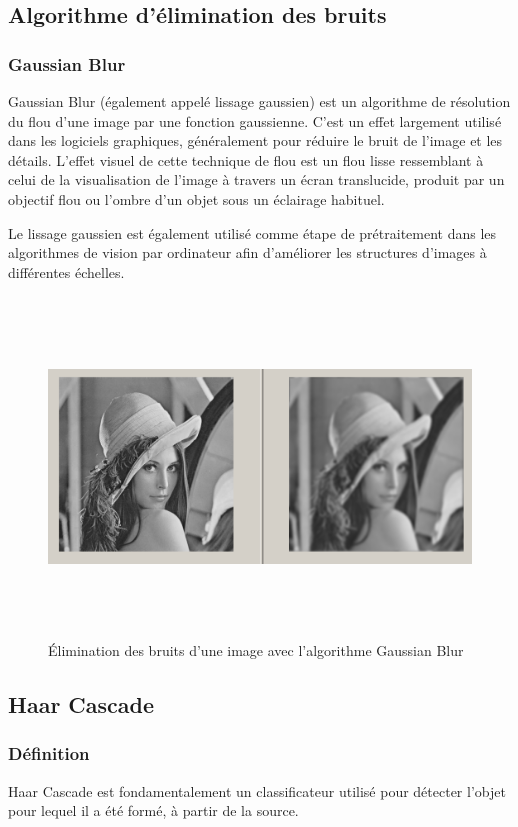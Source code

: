 \documentclass[12pt]{article}
\begin{document}
\subsection{Algorithme d'élimination des bruits}
\subsubsection*{Gaussian Blur}
Gaussian Blur (également appelé lissage gaussien) est un algorithme de résolution du flou d'une image par une fonction gaussienne. C'est un effet largement utilisé dans les logiciels graphiques, généralement pour réduire le bruit de l'image et les détails. L’effet visuel de cette technique de flou est un flou lisse ressemblant à celui de la visualisation de l’image à travers un écran translucide, produit par un objectif flou ou l’ombre d’un objet sous un éclairage habituel. 

Le lissage gaussien est également utilisé comme étape de prétraitement dans les algorithmes de vision par ordinateur afin d'améliorer les structures d'images à différentes échelles.
\begin{figure}[h]
	\centering
	\includegraphics[height=9cm,width=15cm]{img-Chapiter-3/Blure.png}
	\caption{Élimination des bruits d'une image avec l'algorithme Gaussian Blur}
\end{figure}
\newpage
\subsection*{Haar Cascade}
\subsubsection*{Définition}
Haar Cascade est fondamentalement un classificateur utilisé pour détecter l'objet pour lequel il a été formé, à partir de la source.
\end{document}
